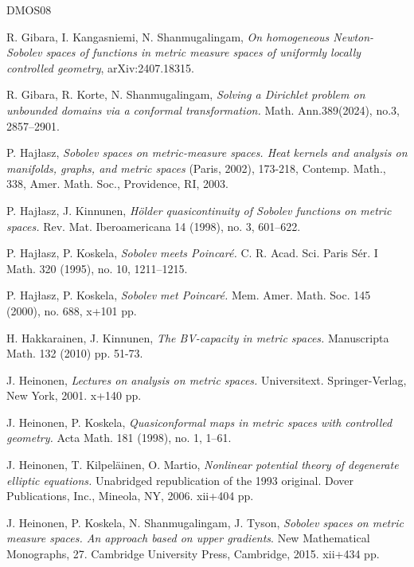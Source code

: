 \documentclass[10pt]{amsart}
\numberwithin{equation}{section}
\begin{document}
\begin{thebibliography}{DMOS08}
	
 R. Gibara, I. Kangasniemi, N. Shanmugalingam, \emph{On homogeneous Newton-Sobolev spaces of functions in metric measure spaces of uniformly locally controlled geometry}, arXiv:2407.18315.

 R. Gibara, R. Korte, N. Shanmugalingam, \emph{Solving a Dirichlet problem on unbounded domains via a conformal transformation.} Math. Ann.389(2024), no.3, 2857–2901.


 P. Haj\l asz, \emph{ Sobolev spaces on metric-measure spaces. Heat kernels and analysis on manifolds, graphs, and metric spaces} (Paris, 2002), 173-218, Contemp. Math., 338, Amer. Math. Soc., Providence, RI, 2003.


 
 P. Hajłasz, J. Kinnunen, \emph{Hölder quasicontinuity of Sobolev functions on metric spaces.} Rev. Mat. Iberoamericana 14 (1998), no. 3, 601–622.
	
	P. Haj\l asz, P. Koskela, \emph{Sobolev meets Poincar\'e.} C. R. Acad. Sci. Paris Sér. I Math. 320 (1995), no. 10, 1211–1215.
	
	P. Hajłasz, P. Koskela, \emph{Sobolev met Poincar\'e.} Mem. Amer. Math. Soc. 145 (2000), no. 688, x+101 pp.

  H. Hakkarainen, J. Kinnunen, \emph{The BV-capacity in metric spaces.} Manuscripta Math. 132 (2010) pp. 51-73.

 J. Heinonen, \emph{Lectures on analysis on metric spaces.} Universitext. Springer-Verlag, New York, 2001. x+140 pp.

	 J. Heinonen, P. Koskela, \emph{Quasiconformal maps in metric spaces with controlled geometry.} Acta Math. 181 (1998), no. 1, 1–61.

 J. Heinonen, T. Kilpeläinen, O. Martio, \emph{Nonlinear potential theory of degenerate elliptic equations.} Unabridged republication of the 1993 original. Dover Publications, Inc., Mineola, NY, 2006. xii+404 pp. 
	
	  J. Heinonen, P.  Koskela, N. Shanmugalingam, J. Tyson, \emph{ Sobolev spaces on metric measure spaces. An approach based on upper gradients}. New Mathematical Monographs, 27. Cambridge University Press, Cambridge, 2015. xii+434 pp.


\end{thebibliography}
\end{document}
